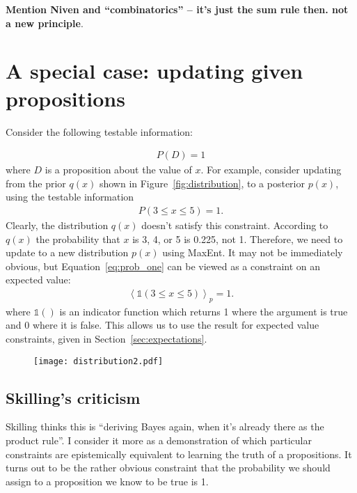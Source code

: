 \documentclass[a4paper, 11pt]{article}
\begin{document}
{\bf Mention Niven and ``combinatorics'' -- it's just the sum rule then. not
a new principle}.

\section{A special case: updating given propositions}
Consider the following testable information:

\begin{eqnarray}
P(D) = 1
\end{eqnarray}
where $D$ is a proposition about the value of $x$. For example, consider
updating from the prior $q(x)$ shown in Figure~\ref{fig:distribution}, to
a posterior $p(x)$, using the testable information
\begin{eqnarray}
P(3 \leq x \leq 5) = 1.\label{eq:prob_one}
\end{eqnarray}
Clearly, the distribution $q(x)$ doesn't satisfy this constraint. According
to $q(x)$ the probability that $x$ is 3, 4, or 5 is 0.225, not 1.
Therefore, we
need to update to a new distribution $p(x)$ using MaxEnt. It may not be
immediately obvious, but Equation~\ref{eq:prob_one} can be viewed as
a constraint on an expected value:
\begin{eqnarray}
\left<
\mathds{1}\left(3 \leq x \leq 5\right)
\right>_p = 1.
\end{eqnarray}
where $\mathds{1}()$ is an indicator function which returns 1 where the
argument is true and 0 where it is false. This allows us to use the
result for expected value constraints, given in
Section~\ref{sec:expectations}.


\begin{figure}
\begin{center}
\texttt{[image: distribution2.pdf]}
\caption{\label{fig:distribution2}}
\end{center}
\end{figure}

\subsection{Skilling's criticism}
Skilling thinks this is ``deriving Bayes again, when it's already there
as the product rule''. I consider it more as a demonstration of which
particular constraints are epistemically equivalent to learning the
truth of a propositions. It turns out to be the rather obvious constraint
that the probability we should assign to a proposition we know to be true
is 1.
\end{document}
